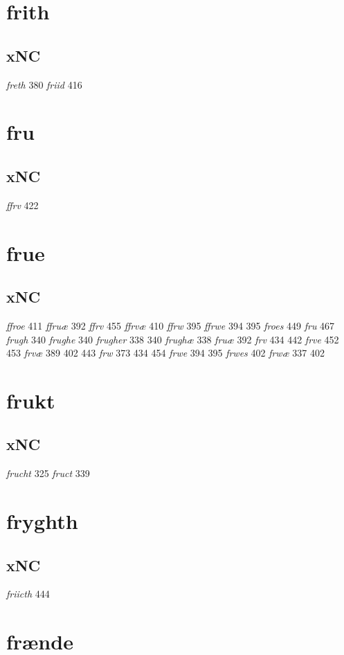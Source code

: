 \documentclass[a4paper,twocolumn]{article}
\begin{document}
\section{frith}
\label{sec:org0aa1fe7}
\subsection{xNC}
\label{sec:org83d1a63}
\emph{freth} 380 \emph{friid} 416 
\section{fru}
\label{sec:org841c8c4}
\subsection{xNC}
\label{sec:org080bafa}
\emph{ffrv} 422 
\section{frue}
\label{sec:orgeb42eb5}
\subsection{xNC}
\label{sec:org25177f3}
\emph{ffroe} 411 \emph{ffruæ} 392 \emph{ffrv} 455 \emph{ffrvæ} 410 \emph{ffrw} 395 \emph{ffrwe} 394 395 \emph{froes} 449 \emph{fru} 467 \emph{frugh} 340 \emph{frughe} 340 \emph{frugher} 338 340 \emph{frughæ} 338 \emph{fruæ} 392 \emph{frv} 434 442 \emph{frve} 452 453 \emph{frvæ} 389 402 443 \emph{frw} 373 434 454 \emph{frwe} 394 395 \emph{frwes} 402 \emph{frwæ} 337 402 
\section{frukt}
\label{sec:org048e250}
\subsection{xNC}
\label{sec:org648505e}
\emph{frucht} 325 \emph{fruct} 339 
\section{fryghth}
\label{sec:org95ef9b0}
\subsection{xNC}
\label{sec:org7206a4b}
\emph{friicth} 444 
\section{frænde}
\label{sec:org17aa8fd}
\end{document}
